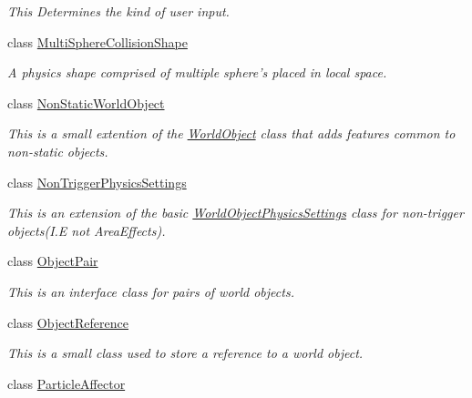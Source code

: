 \begin{DoxyCompactItemize}
\begin{DoxyCompactList}\small\item\em This Determines the kind of user input. \item\end{DoxyCompactList}\item 
class \hyperlink{classMezzanine_1_1MultiSphereCollisionShape}{MultiSphereCollisionShape}
\begin{DoxyCompactList}\small\item\em A physics shape comprised of multiple sphere's placed in local space. \item\end{DoxyCompactList}\item 
class \hyperlink{classMezzanine_1_1NonStaticWorldObject}{NonStaticWorldObject}
\begin{DoxyCompactList}\small\item\em This is a small extention of the \hyperlink{classMezzanine_1_1WorldObject}{WorldObject} class that adds features common to non-\/static objects. \item\end{DoxyCompactList}\item 
class \hyperlink{classMezzanine_1_1NonTriggerPhysicsSettings}{NonTriggerPhysicsSettings}
\begin{DoxyCompactList}\small\item\em This is an extension of the basic \hyperlink{classMezzanine_1_1WorldObjectPhysicsSettings}{WorldObjectPhysicsSettings} class for non-\/trigger objects(I.E not AreaEffects). \item\end{DoxyCompactList}\item 
class \hyperlink{classMezzanine_1_1ObjectPair}{ObjectPair}
\begin{DoxyCompactList}\small\item\em This is an interface class for pairs of world objects. \item\end{DoxyCompactList}\item 
class \hyperlink{classMezzanine_1_1ObjectReference}{ObjectReference}
\begin{DoxyCompactList}\small\item\em This is a small class used to store a reference to a world object. \item\end{DoxyCompactList}\item 
class \hyperlink{classMezzanine_1_1ParticleAffector}{ParticleAffector}

\end{DoxyCompactItemize}
